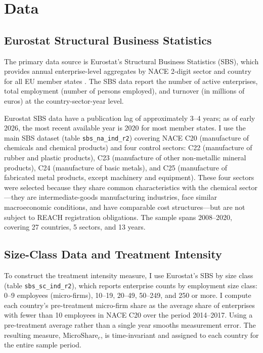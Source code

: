 \documentclass[12pt]{article}
\begin{document}
\section{Data}
\label{sec:data}

\subsection{Eurostat Structural Business Statistics}

The primary data source is Eurostat's Structural Business Statistics (SBS), which provides annual enterprise-level aggregates by NACE 2-digit sector and country for all EU member states \citep{eurostat2021}. The SBS data report the number of active enterprises, total employment (number of persons employed), and turnover (in millions of euros) at the country-sector-year level.

Eurostat SBS data have a publication lag of approximately 3--4 years; as of early 2026, the most recent available year is 2020 for most member states. I use the main SBS dataset (table \texttt{sbs\_na\_ind\_r2}) covering NACE C20 (manufacture of chemicals and chemical products) and four control sectors: C22 (manufacture of rubber and plastic products), C23 (manufacture of other non-metallic mineral products), C24 (manufacture of basic metals), and C25 (manufacture of fabricated metal products, except machinery and equipment). These four sectors were selected because they share common characteristics with the chemical sector---they are intermediate-goods manufacturing industries, face similar macroeconomic conditions, and have comparable cost structures---but are not subject to REACH registration obligations. The sample spans 2008--2020, covering 27 countries, 5 sectors, and 13 years.

\subsection{Size-Class Data and Treatment Intensity}

To construct the treatment intensity measure, I use Eurostat's SBS by size class (table \texttt{sbs\_sc\_ind\_r2}), which reports enterprise counts by employment size class: 0--9 employees (micro-firms), 10--19, 20--49, 50--249, and 250 or more. I compute each country's pre-treatment micro-firm share as the average share of enterprises with fewer than 10 employees in NACE C20 over the period 2014--2017. Using a pre-treatment average rather than a single year smooths measurement error. The resulting measure, $\text{MicroShare}_c$, is time-invariant and assigned to each country for the entire sample period.
\end{document}
